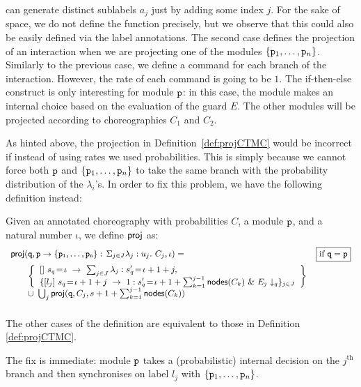     can generate distinct sublabels $a_j$ just by adding some index
    $j$. For the sake of space, we do not define the function
    precisely, but we observe that this could also be easily defined
    via the label annotations. The second case defines the projection
    of an interaction when we are projecting one of the modules
    $\{\mathtt{p}_1,\ldots,\mathtt{p}_n\}$. Similarly to the previous case,
    we define a command for each branch of the interaction. However,
    the rate of each command is going to be $1$. The if-then-else
    construct is only interesting for module $\mathtt{p}$: in this case,
    the module makes an internal choice based on the evaluation of the
    guard $E$. The other modules will be projected according to
    choreographies $C_1$ and $C_2$.

    As hinted above, the projection in Definition~\ref{def:projCTMC}
    would be incorrect if instead of using rates we used
    probabilities. This is simply because we cannot force both
    $\mathtt{p}$ and $\{\mathtt{p}_1,\ldots,\mathtt{p}_n\}$ to take the same
    branch with the probability distribution of the $\lambda_i$'s. In
    order to fix this problem, we have the following definition
    instead:
    \begin{definition}\label{def:projDTMC} Given an annotated
      choreography with probabilities $C$, a module $\mathtt{p}$, and a
      natural number $\iota$, we define $\mathsf{proj}$ as:
      \begin{displaymath}\small
        \begin{array}{lr}

          \proj (\role q,\interact{p}{\role p_1,\ldots,\role p_n}, \iota)= 
          &  \boxed{\text{if }\role q=\role p}\\[2mm]
          \qquad
          \left\{
          \begin{array}{lll}
            \commandBase {} {s_{q}\!=\! \iota}{\ \sum_{j\in J} \lambda_j: s'_{q}\!=\! \iota+1+j},\\ 
            \{\commandBase {l_j} {s_{q}\!=\! \iota+1+j}
            \ 1: s'_{q}\!=\! \iota+1+\sum_{k=1}^{j-1}\mathsf{nodes}({C_k})\ \&\ \projE
            {E_j}q\}_{j\in J}
          \end{array}
          \right\}
          \\
          \qquad\cup\ \bigcup_{j} \proj (\role q, C_j, s+1+\sum_{k=1}^{j-1}\mathsf{nodes}({C_k}))
          \\\\

        \end{array}
      \end{displaymath}
      The other cases of the definition are equivalent to those in
      Definition \ref{def:projCTMC}.
    \end{definition}
    The fix is immediate: module $\mathtt{p}$ takes a (probabilistic)
    internal decision on the $j^{\text{th}}$ branch and then
    synchronises on label $l_j$ with $\{\mathtt{p}_1,\ldots,\mathtt{p}_n\}$.       

